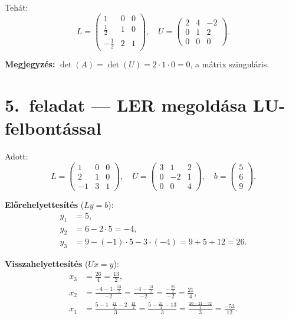 \documentclass[a4paper,12pt]{article}
\begin{document}
Tehát:
\[
L = \begin{pmatrix} 1 & 0 & 0 \\ \frac{1}{2} & 1 & 0 \\ -\frac{1}{2} & 2 & 1 \end{pmatrix}, \quad
U = \begin{pmatrix} 2 & 4 & -2 \\ 0 & 1 & 2 \\ 0 & 0 & 0 \end{pmatrix}.
\]

\textbf{Megjegyzés:} $\det(A) = \det(U) = 2\cdot 1\cdot 0 = 0$, a mátrix szinguláris.

\section*{5.\ feladat --- LER megoldása LU-felbontással}

Adott:
\[
L = \begin{pmatrix} 1 & 0 & 0 \\ 2 & 1 & 0 \\ -1 & 3 & 1 \end{pmatrix}, \quad
U = \begin{pmatrix} 3 & 1 & 2 \\ 0 & -2 & 1 \\ 0 & 0 & 4 \end{pmatrix}, \quad
b = \begin{pmatrix} 5 \\ 6 \\ 9 \end{pmatrix}.
\]

\textbf{Előrehelyettesítés} ($Ly = b$):
\begin{align}
y_1 &= 5, \\
y_2 &= 6 - 2\cdot 5 = -4, \\
y_3 &= 9 - (-1)\cdot 5 - 3\cdot(-4) = 9 + 5 + 12 = 26.
\end{align}

\textbf{Visszahelyettesítés} ($Ux = y$):
\begin{align}
x_3 &= \frac{26}{4} = \frac{13}{2}, \\[4pt]
x_2 &= \frac{-4 - 1\cdot\frac{13}{2}}{-2} = \frac{-4 - \frac{13}{2}}{-2} = \frac{-\frac{21}{2}}{-2} = \frac{21}{4}, \\[4pt]
x_1 &= \frac{5 - 1\cdot\frac{21}{4} - 2\cdot\frac{13}{2}}{3} = \frac{5 - \frac{21}{4} - 13}{3} = \frac{\frac{20-21-52}{4}}{3} = \frac{-53}{12}.
\end{align}
\end{document}
